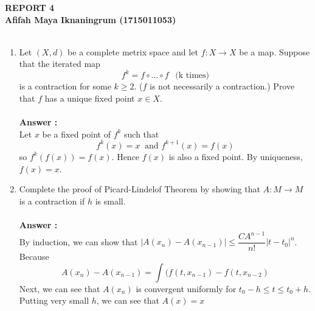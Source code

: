 \documentclass[a4paper,10pt]{article}
\begin{document}
\newpage
\textbf{REPORT 4 \\ Afifah Maya Iknaningrum (1715011053)}\\ \\

\begin{enumerate}
	\item Let $ (X,d) $ be a complete metrix space and let $ f :X \rightarrow X $ be a map. Suppose that the iterated map
	\[ f^{k} = f \circ\dots\circ f \ \ \text{ (k times)} \]
	is a contraction for some $ k\geq2 $. ($ f $ is not necessarily a contraction.) Prove that $ f $ has a  unique fixed point $ x\in X $.\\ \\
	\textbf{Answer :}\\
	Let $ x $ be a fixed point of $ f^{k} $ such that
	\[ f^{k}(x) = x \ \text{ and } f^{k+1}(x) =  f(x) \]
	so $ f^{k}(f(x)) =f(x) $.
	Hence $ f(x) $ is also a fixed point. By uniqueness, $ f(x)=x $.
	\item Complete the proof of Picard-Lindelof Theorem by showing that $ A : M\rightarrow M $ is a contraction if $ h $ is small.\\ \\
	\textbf{Answer :}\\
	By induction, we can show that $ | A(x_{n})-A(x_{n-1}) | \leq \dfrac{CA^{n-1}}{n!} |t-t_{0}|^{n} $. Because
	\[ A(x_{n}) - A(x_{n-1}) = \int (f(t,x_{n-1})-f(t,x_{n-2}) \]
	Next, we can see that $ A(x_{n}) $ is convergent uniformly for $ t_{0}-h \leq t \leq t_{0}+h $. Putting very small $ h $, we can see that $ A(x)=x $
\end{enumerate}
\end{document}
